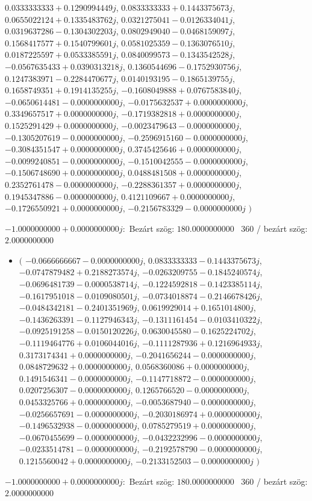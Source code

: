 \documentclass[14pt,a4paper]{article}
\begin{document}
\begin{itemize}
$0.0333333333+0.1290994449j$, $0.0833333333+0.1443375673j$, $0.0655022124+0.1335483762j$, $0.0321275041-0.0126334041j$, $0.0319637286-0.1304302203j$, $0.0802949040-0.0468159097j$, $0.1568417577+0.1540799601j$, $0.0581025359-0.1363076510j$, $0.0187225597+0.0533385591j$, $0.0840099573-0.1343542528j$, $-0.0567635433+0.0390313218j$, $0.1360544696-0.1752930756j$, $0.1247383971-0.2284470677j$, $0.0140193195-0.1865139755j$, $0.1658749351+0.1914135255j$, $-0.1608049888+0.0767583840j$, $-0.0650614481-0.0000000000j$, $-0.0175632537+0.0000000000j$, $0.3349657517+0.0000000000j$, $-0.1719382818+0.0000000000j$, $0.1525291429+0.0000000000j$, $-0.0023479643-0.0000000000j$, $-0.1305207619-0.0000000000j$, $-0.2596915160-0.0000000000j$, $-0.3084351547+0.0000000000j$, $0.3745425646+0.0000000000j$, $-0.0099240851-0.0000000000j$, $-0.1510042555-0.0000000000j$, $-0.1506748690+0.0000000000j$, $0.0488481508+0.0000000000j$, $0.2352761478-0.0000000000j$, $-0.2288361357+0.0000000000j$, $0.1945347886-0.0000000000j$, $0.4121109667+0.0000000000j$, $-0.1726550921+0.0000000000j$, $-0.2156783329-0.0000000000j$
$\big)$
\end{itemize}
$-1.0000000000+0.0000000000j$:\
Bezárt szög: $180.0000000000$ \
360 / bezárt szög: $2.0000000000$\
\begin{itemize}
\item
$\big($
$-0.0666666667-0.0000000000j$, $0.0833333333-0.1443375673j$, $-0.0747879482+0.2188273574j$, $-0.0263209755-0.1845240574j$, $-0.0696481739-0.0000538714j$, $-0.1224592818-0.1423385114j$, $-0.1617951018-0.0109080501j$, $-0.0734018874-0.2146678426j$, $-0.0484342181-0.2401351969j$, $0.0619929014+0.1651014800j$, $-0.1436263391-0.1127946343j$, $-0.1311161454-0.0103410322j$, $-0.0925191258-0.0150120226j$, $0.0630045580-0.1625224702j$, $-0.1119464776+0.0106044016j$, $-0.1111287936+0.1216964933j$, $0.3173174341+0.0000000000j$, $-0.2041656244-0.0000000000j$, $0.0848729632+0.0000000000j$, $0.0568360086+0.0000000000j$, $0.1491546341-0.0000000000j$, $-0.1147718872-0.0000000000j$, $0.0207256307-0.0000000000j$, $0.1265766520-0.0000000000j$, $0.0453325766+0.0000000000j$, $-0.0053687940-0.0000000000j$, $-0.0256657691-0.0000000000j$, $-0.2030186974+0.0000000000j$, $-0.1496532938-0.0000000000j$, $0.0785279519+0.0000000000j$, $-0.0670455699-0.0000000000j$, $-0.0432232996-0.0000000000j$, $-0.0233514781-0.0000000000j$, $-0.2192578790-0.0000000000j$, $0.1215560042+0.0000000000j$, $-0.2133152503-0.0000000000j$
$\big)$
\end{itemize}
$-1.0000000000+0.0000000000j$:\
Bezárt szög: $180.0000000000$ \
360 / bezárt szög: $2.0000000000$\
\end{document}
